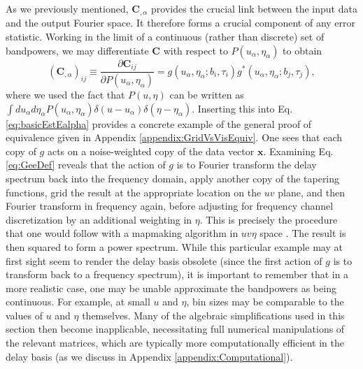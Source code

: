 \documentclass[twocolumn,aps,prd,nofootinbib,showpacs]{revtex4-1}
\begin{document}
As we previously mentioned, $\mathbf{C}_{,\alpha}$ provides the crucial link between the input data and the output Fourier space.  It therefore forms a crucial component of any error statistic.  Working in the limit of a continuous (rather than discrete) set of bandpowers, we may differentiate $\mathbf{C}$ with respect to $P(u_\alpha, \eta_\alpha)$ to obtain
\begin{equation}
\label{eq:CcommaAlphaggstar}
(\mathbf{C}_{,\alpha})_{ij} \equiv \frac{\partial \mathbf{C}_{ij}}{\partial P(u_\alpha, \eta_\alpha)} = g(u_\alpha, \eta_\alpha; b_i, \tau_i) g^* (u_\alpha, \eta_\alpha; b_j, \tau_j),
\end{equation}
where we used the fact that $P(u, \eta)$ can be written as $\int du_\alpha d\eta_\alpha P(u_\alpha, \eta_\alpha) \delta(u - u_\alpha) \delta (\eta - \eta_\alpha) $.  Inserting this into Eq. \eqref{eq:basicEstEalpha} provides a concrete example of the general proof of equivalence given in Appendix \ref{appendix:GridVsVisEquiv}.  One sees that each copy of $g$ acts on a noise-weighted copy of the data vector $\mathbf{x}$.  Examining Eq. \eqref{eq:GeeDef} reveals that the action of $g$ is to Fourier transform the delay spectrum back into the frequency domain, apply another copy of the tapering functions, grid the result at the appropriate location on the $uv$ plane, and then Fourier transform in frequency again, before adjusting for frequency channel discretization by an additional weighting in $\eta$.  This is precisely the procedure that one would follow with a mapmaking algorithm in $uv\eta$ space \cite{Morales2008}.  The result is then squared to form a power spectrum.  While this particular example may at first sight seem to render the delay basis obsolete (since the first action of $g$ is to transform back to a frequency spectrum), it is important to remember that in a more realistic case, one may be unable approximate the bandpowers as being continuous.  For example, at small $u$ and $\eta$, bin sizes may be comparable to the values of $u$ and $\eta$ themselves.  Many of the algebraic simplifications used in this section then become inapplicable, necessitating full numerical manipulations of the relevant matrices, which are typically more computationally efficient in the delay basis (as we discuss in Appendix \ref{appendix:Computational}).
\end{document}
